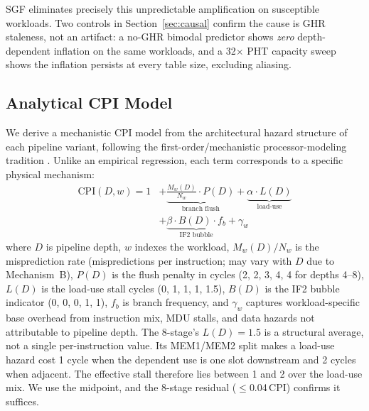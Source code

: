 \documentclass[acmsmall,nonacm,screen]{acmart}
\begin{document}
SGF eliminates precisely this unpredictable amplification on susceptible workloads. Two controls in Section~\ref{sec:causal} confirm the cause is GHR staleness, not an artifact: a no-GHR bimodal predictor shows \emph{zero} depth-dependent inflation on the same workloads, and a 32$\times$ PHT capacity sweep shows the inflation persists at every table size, excluding aliasing.

\subsection{Analytical CPI Model}
\label{sec:model}

We derive a mechanistic CPI model from the architectural hazard structure of each pipeline variant, following the first-order/mechanistic processor-modeling tradition \cite{karkhanis2004first}.
Unlike an empirical regression, each term corresponds to a specific physical mechanism:
\begin{equation}
\begin{aligned}
\text{CPI}(D, w) = 1 &+ \underbrace{\frac{M_w(D)}{N_w} \cdot P(D)}_{\text{branch flush}}
+ \underbrace{\alpha \cdot L(D)}_{\text{load-use}} \\
&+ \underbrace{\beta \cdot B(D) \cdot f_b}_{\text{IF2 bubble}} + \gamma_w
\end{aligned}
\label{eq:cpi_model}
\end{equation}
where $D$ is pipeline depth, $w$ indexes the workload, $M_w(D)/N_w$ is the misprediction rate (mispredictions per instruction; may vary with $D$ due to Mechanism~B), $P(D)$ is the flush penalty in cycles (2, 2, 3, 4, 4 for depths 4--8), $L(D)$ is the load-use stall cycles (0, 1, 1, 1, 1.5), $B(D)$ is the IF2 bubble indicator (0, 0, 0, 1, 1), $f_b$ is branch frequency, and $\gamma_w$ captures workload-specific base overhead from instruction mix, MDU stalls, and data hazards not attributable to pipeline depth.
The 8-stage's $L(D) = 1.5$ is a structural average, not a single per-instruction value. Its MEM1/MEM2 split makes a load-use hazard cost 1 cycle when the dependent use is one slot downstream and 2 cycles when adjacent. The effective stall therefore lies between 1 and 2 over the load-use mix. We use the midpoint, and the 8-stage residual ($\leq$0.04\,CPI) confirms it suffices.
\end{document}
